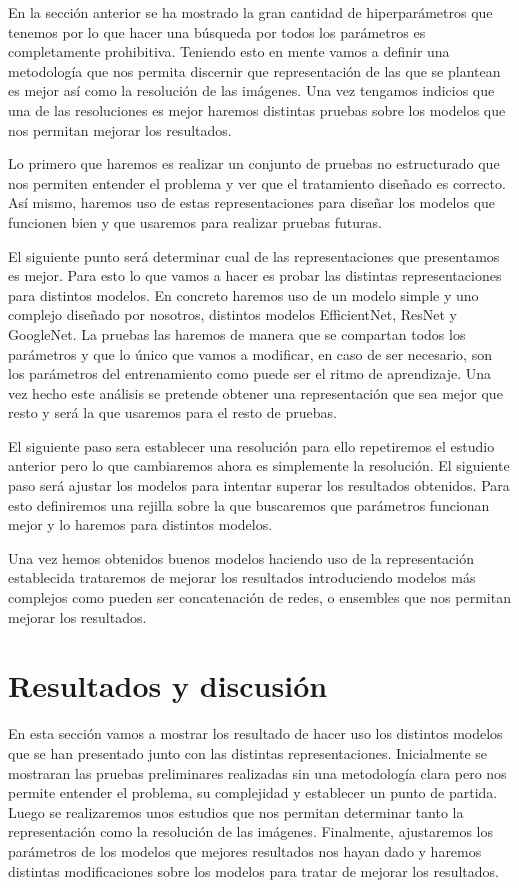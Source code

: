 \documentclass[a4paper,12pt,twoside,titlepage]{article}
\begin{document}
En la sección anterior se ha mostrado la gran cantidad de hiperparámetros que tenemos por lo que hacer una búsqueda por todos los parámetros es completamente prohibitiva. Teniendo esto en mente vamos a definir una metodología que nos permita discernir que representación de las que se plantean es mejor así como la resolución de las imágenes. Una vez tengamos indicios que una de las resoluciones es mejor haremos distintas pruebas sobre los modelos que nos permitan mejorar los resultados.

Lo primero que haremos es realizar un conjunto de pruebas no estructurado que nos permiten entender el problema y ver que el tratamiento diseñado es correcto. Así mismo, haremos uso de estas representaciones para diseñar los modelos que funcionen bien y que usaremos para realizar pruebas futuras.

El siguiente punto será determinar cual de las representaciones que presentamos es mejor. Para esto lo que vamos a hacer es probar las distintas representaciones para distintos modelos. En concreto haremos uso de un modelo simple y uno complejo diseñado por nosotros, distintos modelos EfficientNet, ResNet y GoogleNet. La pruebas las haremos de manera que se compartan todos los parámetros y que lo único que vamos a modificar, en caso de ser necesario, son los parámetros del entrenamiento como puede ser el ritmo de aprendizaje. Una vez hecho este análisis se pretende obtener una representación que sea mejor que resto y será la que usaremos para el resto de pruebas. 

El siguiente paso sera establecer una resolución para ello repetiremos el estudio anterior pero lo que cambiaremos ahora es simplemente la resolución. El siguiente paso será ajustar los modelos para intentar superar los resultados obtenidos. Para esto definiremos una rejilla sobre la que buscaremos que parámetros funcionan mejor y lo haremos para distintos modelos.

Una vez hemos obtenidos buenos modelos haciendo uso de la representación establecida trataremos de mejorar los resultados introduciendo modelos más complejos como pueden ser concatenación de redes, o ensembles que nos permitan mejorar los resultados.

\section{Resultados y discusión}

En esta sección vamos a mostrar los resultado de hacer uso los distintos modelos que se han presentado junto con las distintas representaciones. Inicialmente se mostraran las pruebas preliminares realizadas sin una metodología clara pero nos permite entender el problema, su complejidad y establecer un punto de partida. Luego se realizaremos unos estudios que nos permitan determinar tanto la representación como la resolución de las imágenes. Finalmente, ajustaremos los parámetros de los modelos que mejores resultados nos hayan dado y haremos distintas modificaciones sobre los modelos para tratar de mejorar los resultados.
\end{document}
